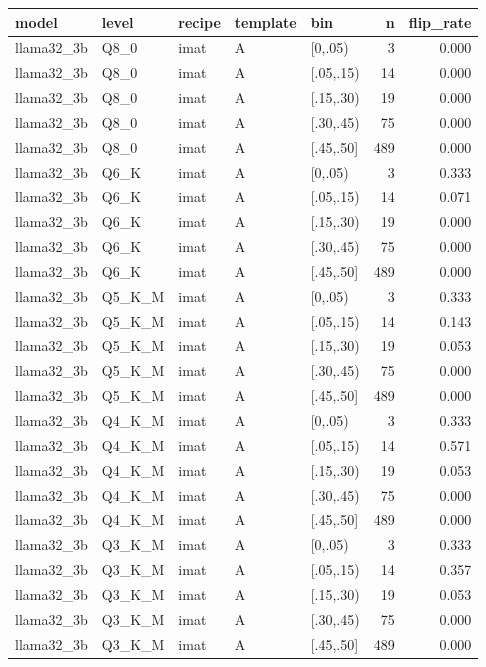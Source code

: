 \begin{tabular}{lllllrr}
\toprule
model & level & recipe & template & bin & n & flip\_rate \\
\midrule
llama32\_3b & Q8\_0 & imat & A & [0,.05) & 3 & 0.000 \\
llama32\_3b & Q8\_0 & imat & A & [.05,.15) & 14 & 0.000 \\
llama32\_3b & Q8\_0 & imat & A & [.15,.30) & 19 & 0.000 \\
llama32\_3b & Q8\_0 & imat & A & [.30,.45) & 75 & 0.000 \\
llama32\_3b & Q8\_0 & imat & A & [.45,.50] & 489 & 0.000 \\
llama32\_3b & Q6\_K & imat & A & [0,.05) & 3 & 0.333 \\
llama32\_3b & Q6\_K & imat & A & [.05,.15) & 14 & 0.071 \\
llama32\_3b & Q6\_K & imat & A & [.15,.30) & 19 & 0.000 \\
llama32\_3b & Q6\_K & imat & A & [.30,.45) & 75 & 0.000 \\
llama32\_3b & Q6\_K & imat & A & [.45,.50] & 489 & 0.000 \\
llama32\_3b & Q5\_K\_M & imat & A & [0,.05) & 3 & 0.333 \\
llama32\_3b & Q5\_K\_M & imat & A & [.05,.15) & 14 & 0.143 \\
llama32\_3b & Q5\_K\_M & imat & A & [.15,.30) & 19 & 0.053 \\
llama32\_3b & Q5\_K\_M & imat & A & [.30,.45) & 75 & 0.000 \\
llama32\_3b & Q5\_K\_M & imat & A & [.45,.50] & 489 & 0.000 \\
llama32\_3b & Q4\_K\_M & imat & A & [0,.05) & 3 & 0.333 \\
llama32\_3b & Q4\_K\_M & imat & A & [.05,.15) & 14 & 0.571 \\
llama32\_3b & Q4\_K\_M & imat & A & [.15,.30) & 19 & 0.053 \\
llama32\_3b & Q4\_K\_M & imat & A & [.30,.45) & 75 & 0.000 \\
llama32\_3b & Q4\_K\_M & imat & A & [.45,.50] & 489 & 0.000 \\
llama32\_3b & Q3\_K\_M & imat & A & [0,.05) & 3 & 0.333 \\
llama32\_3b & Q3\_K\_M & imat & A & [.05,.15) & 14 & 0.357 \\
llama32\_3b & Q3\_K\_M & imat & A & [.15,.30) & 19 & 0.053 \\
llama32\_3b & Q3\_K\_M & imat & A & [.30,.45) & 75 & 0.000 \\
llama32\_3b & Q3\_K\_M & imat & A & [.45,.50] & 489 & 0.000 \\

\end{tabular}
